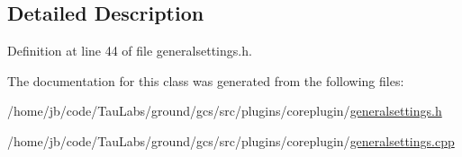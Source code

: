 \subsection{\-Detailed \-Description}


\-Definition at line 44 of file generalsettings.\-h.



\-The documentation for this class was generated from the following files\-:\begin{DoxyCompactItemize}
\item 
/home/jb/code/\-Tau\-Labs/ground/gcs/src/plugins/coreplugin/\hyperlink{generalsettings_8h}{generalsettings.\-h}\item 
/home/jb/code/\-Tau\-Labs/ground/gcs/src/plugins/coreplugin/\hyperlink{generalsettings_8cpp}{generalsettings.\-cpp}\end{DoxyCompactItemize}
